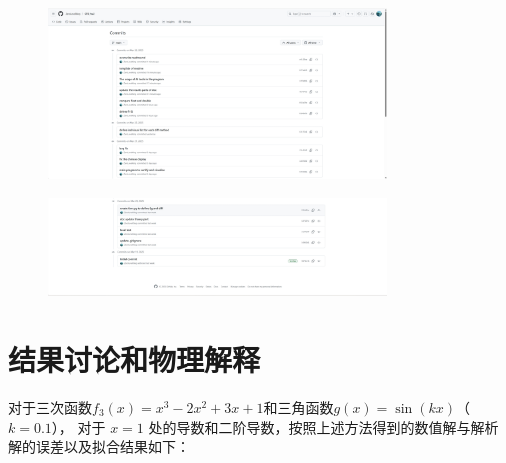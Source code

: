 \documentclass[UTF8]{ctexart}
\begin{document}
\begin{figure}[H]
    \centering
    \includegraphics[width=0.8\textwidth]{c1.png} 
\end{figure}
\begin{figure}[H]
    \centering
    \includegraphics[width=0.8\textwidth]{c2.png} 
\end{figure}

\section{结果讨论和物理解释}
对于三次函数$f_3(x) = x^3 - 2x^2 + 3x + 1$和三角函数$g(x) = \sin(kx)$（$k = 0.1$），
对于 $x = 1$ 处的导数和二阶导数，按照上述方法得到的数值解与解析解的误差以及拟合结果如下：
\end{document}
